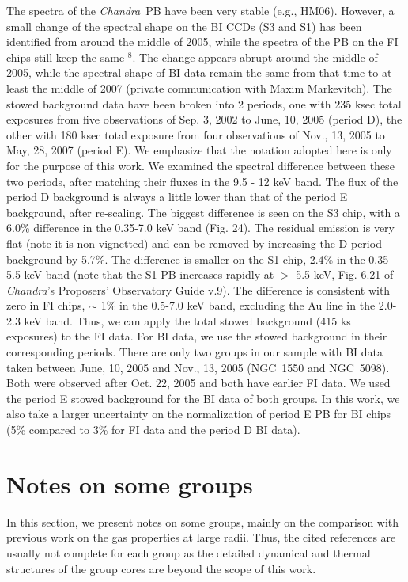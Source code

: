 \documentclass{aastex}
\def\chandra    {{\em Chandra}\/}
\begin{document}
\begin{appendix}
The spectra of the \chandra\ PB have been very stable (e.g., HM06).
However, a small change of the spectral shape on the BI CCDs (S3 and S1)
has been identified from around the middle of 2005, while the
spectra of the PB on the FI chips still keep the same $^{8}$.
The change appears abrupt around the middle of 2005, while the spectral shape of
BI data remain the same from that time to at least the middle of 2007 (private
communication with Maxim Markevitch). The
stowed background data have been broken into 2 periods, one with 235 ksec total
exposures from five observations of Sep. 3, 2002 to June, 10, 2005 (period D), the other
with 180 ksec total exposure from four observations of Nov., 13, 2005 to May, 28, 2007
(period E). We emphasize that the notation
adopted here is only for the purpose of this work.
We examined the spectral difference between these two periods, after matching
their fluxes in the 9.5 - 12 keV band. The flux of the period D background is
always a little lower than that of the period E background, after re-scaling.
The biggest difference is seen on the S3 chip, with a 6.0\% difference in the
0.35-7.0 keV band (Fig. 24). The residual emission is very
flat (note it is non-vignetted) and can be removed by increasing the D period
background by 5.7\%. The difference is smaller on the S1 chip, 2.4\% in the
0.35-5.5 keV band (note that the S1 PB increases rapidly at $>$ 5.5
keV, Fig. 6.21 of \chandra's Proposers' Observatory Guide v.9). The difference
is consistent with zero in FI chips, $\sim$ 1\% in the 0.5-7.0 keV band,
excluding the Au line in the 2.0-2.3 keV band. Thus, we can apply the total
stowed background (415 ks exposures) to the FI data. For BI data, we use the
stowed background in their corresponding periods. There are only two groups in our sample
with BI data taken between June, 10, 2005 and Nov., 13, 2005 (NGC~1550 and NGC~5098).
Both were observed after Oct. 22, 2005 and both have earlier FI data. We used the
period E stowed background for the BI data of both groups.
In this work, we also take a larger uncertainty on the normalization of
period E PB for BI chips (5\% compared to 3\% for FI data and the period D BI data).

\section{Notes on some groups}

In this section, we present notes on some groups, mainly on the comparison
with previous work on the gas properties at large radii. Thus, the cited references
are usually not complete for each group as the detailed dynamical and thermal
structures of the group cores are beyond the scope of this work.


\end{appendix}
\end{document}
